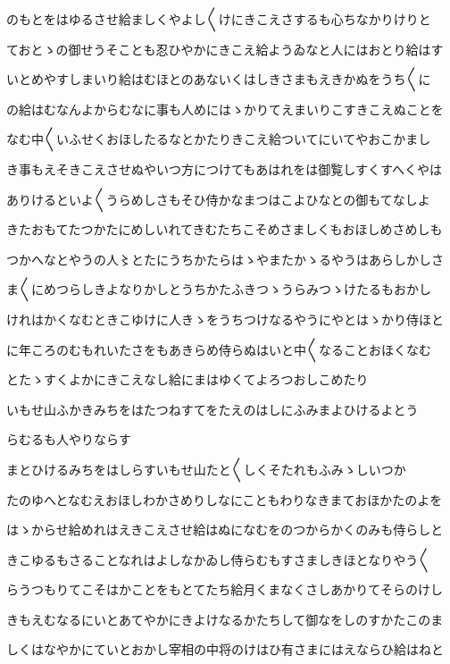 \documentclass[a4paper,11pt,landscape]{ltjtarticle}
\begin{document}
\par\medskip
のもとをはゆるさせ給ましくやよし〱けにきこえさするも心ちなかりけりと
\par\medskip
ておとゝの御せうそことも忍ひやかにきこえ給ようゐなと人にはおとり給はす
\par\medskip
いとめやすしまいり給はむほとのあないくはしきさまもえきかぬをうち〱に
\par\medskip
の給はむなんよからむなに事も人めにはゝかりてえまいりこすきこえぬことを
\par\medskip
なむ中〱いふせくおほしたるなとかたりきこえ給ついてにいてやおこかまし
\par\medskip
き事もえそきこえさせぬやいつ方につけてもあはれをは御覧しすくすへくやは
\par\medskip
ありけるといよ〱うらめしさもそひ侍かなまつはこよひなとの御もてなしよ
\par\medskip
きたおもてたつかたにめしいれてきむたちこそめさましくもおほしめさめしも
\par\medskip
つかへなとやうの人〻とたにうちかたらはゝやまたかゝるやうはあらしかしさ
\par\medskip
ま〱にめつらしきよなりかしとうちかたふきつゝうらみつゝけたるもおかし
\par\medskip
けれはかくなむときこゆけに人きゝをうちつけなるやうにやとはゝかり侍ほと
\par\medskip
に年ころのむもれいたさをもあきらめ侍らぬはいと中〱なることおほくなむ
\par\medskip
とたゝすくよかにきこえなし給にまはゆくてよろつおしこめたり
\par\medskip
いもせ山ふかきみちをはたつねすてをたえのはしにふみまよひけるよとう
\par\medskip
らむるも人やりならす
\par\medskip
まとひけるみちをはしらすいもせ山たと〱しくそたれもふみゝしいつか
\par\medskip
たのゆへとなむえおほしわかさめりしなにこともわりなきまておほかたのよを
\par\medskip
はゝからせ給めれはえきこえさせ給はぬになむをのつからかくのみも侍らしと
\par\medskip
きこゆるもさることなれはよしなかゐし侍らむもすさましきほとなりやう〱
\par\medskip
らうつもりてこそはかことをもとてたち給月くまなくさしあかりてそらのけし
\par\medskip
きもえむなるにいとあてやかにきよけなるかたちして御なをしのすかたこのま
\par\medskip
しくはなやかにていとおかし宰相の中将のけはひ有さまにはえならひ給はねと
\end{document}

